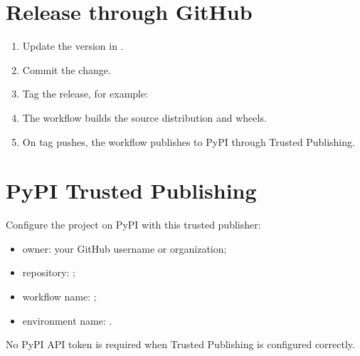 \documentclass[a4paper,11pt,english]{sphinxmanual}
\begin{document}
\section{Release through GitHub}
\label{\detokenize{release:release-through-github}}\begin{enumerate}
%
\item {} 
\sphinxAtStartPar
Update the version in .

\item {} 
\sphinxAtStartPar
Commit the change.

\item {} 
\sphinxAtStartPar
Tag the release, for example:

\begin{sphinxVerbatim}[commandchars=\\\{\}]
  
    
\end{sphinxVerbatim}

\item {} 
\sphinxAtStartPar
The  workflow builds the source distribution and wheels.

\item {} 
\sphinxAtStartPar
On tag pushes, the workflow publishes to PyPI through Trusted Publishing.

\end{enumerate}


\section{PyPI Trusted Publishing}
\label{\detokenize{release:pypi-trusted-publishing}}
\sphinxAtStartPar
Configure the project on PyPI with this trusted publisher:
\begin{itemize}
\item {} 
\sphinxAtStartPar
owner: your GitHub username or organization;

\item {} 
\sphinxAtStartPar
repository: ;

\item {} 
\sphinxAtStartPar
workflow name: ;

\item {} 
\sphinxAtStartPar
environment name: .

\end{itemize}

\sphinxAtStartPar
No PyPI API token is required when Trusted Publishing is configured correctly.



\renewcommand{\indexname}{Index}
\printindex
\end{document}
